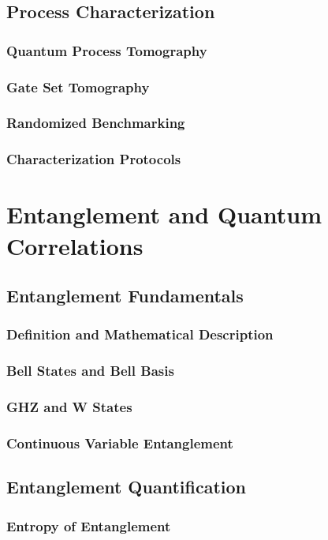 \documentclass[12pt,a4paper]{book}
\begin{document}
\section{Process Characterization}
\subsection{Quantum Process Tomography}
\subsection{Gate Set Tomography}
\subsection{Randomized Benchmarking}
\subsection{Characterization Protocols}

\chapter{Entanglement and Quantum Correlations}

\section{Entanglement Fundamentals}
\subsection{Definition and Mathematical Description}
\subsection{Bell States and Bell Basis}
\subsection{GHZ and W States}
\subsection{Continuous Variable Entanglement}

\section{Entanglement Quantification}
\subsection{Entropy of Entanglement}
\end{document}
